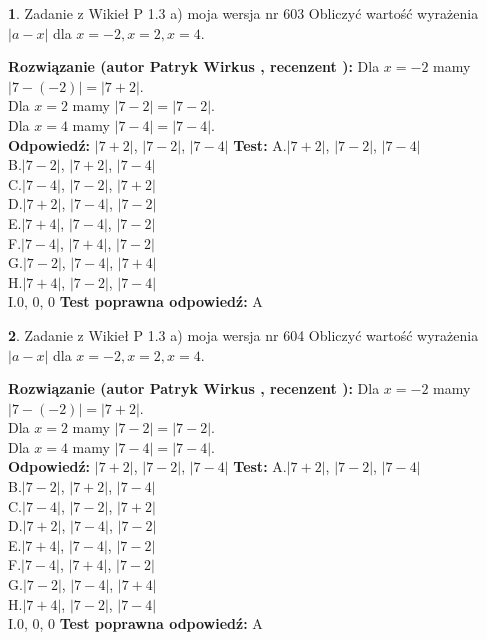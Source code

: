 \documentclass[12pt, a4paper]{article}
\theoremstyle{definition} %
\newtheorem{zad}{}
\newcommand{\zadStart}[1]{\begin{zad}#1\newline}
\newcommand{\zadStop}{\end{zad}}
\newcommand{\rozwStart}[2]{\noindent \textbf{Rozwiązanie (autor #1 , recenzent #2): }\newline}
\newcommand{\rozwStop}{\newline}
\newcommand{\odpStart}{\noindent \textbf{Odpowiedź:}\newline}
\newcommand{\odpStop}{\newline}
\newcommand{\testStart}{\noindent \textbf{Test:}\newline}
\newcommand{\testStop}{\newline}
\newcommand{\kluczStart}{\noindent \textbf{Test poprawna odpowiedź:}\newline}
\newcommand{\kluczStop}{\newline}
\begin{document}
\zadStart{Zadanie z Wikieł P 1.3 a) moja wersja nr 603}
Obliczyć wartość wyrażenia $|a - x|$ dla $x=-2,x=2,x=4$.
\zadStop
\rozwStart{Patryk Wirkus}{}
Dla $x = -2$ mamy $|7 - (-2)| = |7 + 2|$.\\
Dla $x = 2$ mamy $|7 - 2| = |7 - 2|$.\\
Dla $x = 4$ mamy $|7 - 4| = |7 - 4|$.\\
\rozwStop
\odpStart
$|7 + 2|$, $|7 - 2|$, $|7 - 4|$
\odpStop
\testStart
A.$|7 + 2|$, $|7 - 2|$, $|7 - 4|$\\
B.$|7 - 2|$, $|7 + 2|$, $|7 - 4|$\\
C.$|7 - 4|$, $|7 - 2|$, $|7 + 2|$\\
D.$|7 + 2|$, $|7 - 4|$, $|7 - 2|$\\
E.$|7 + 4|$, $|7 - 4|$, $|7 - 2|$\\
F.$|7 - 4|$, $|7 + 4|$, $|7 - 2|$\\
G.$|7 - 2|$, $|7 - 4|$, $|7 + 4|$\\
H.$|7 + 4|$, $|7 - 2|$, $|7 - 4|$\\
I.$0$, $0$, $0$
\testStop
\kluczStart
A
\kluczStop



\zadStart{Zadanie z Wikieł P 1.3 a) moja wersja nr 604}
Obliczyć wartość wyrażenia $|a - x|$ dla $x=-2,x=2,x=4$.
\zadStop
\rozwStart{Patryk Wirkus}{}
Dla $x = -2$ mamy $|7 - (-2)| = |7 + 2|$.\\
Dla $x = 2$ mamy $|7 - 2| = |7 - 2|$.\\
Dla $x = 4$ mamy $|7 - 4| = |7 - 4|$.\\
\rozwStop
\odpStart
$|7 + 2|$, $|7 - 2|$, $|7 - 4|$
\odpStop
\testStart
A.$|7 + 2|$, $|7 - 2|$, $|7 - 4|$\\
B.$|7 - 2|$, $|7 + 2|$, $|7 - 4|$\\
C.$|7 - 4|$, $|7 - 2|$, $|7 + 2|$\\
D.$|7 + 2|$, $|7 - 4|$, $|7 - 2|$\\
E.$|7 + 4|$, $|7 - 4|$, $|7 - 2|$\\
F.$|7 - 4|$, $|7 + 4|$, $|7 - 2|$\\
G.$|7 - 2|$, $|7 - 4|$, $|7 + 4|$\\
H.$|7 + 4|$, $|7 - 2|$, $|7 - 4|$\\
I.$0$, $0$, $0$
\testStop
\kluczStart
A
\kluczStop
\end{document}
